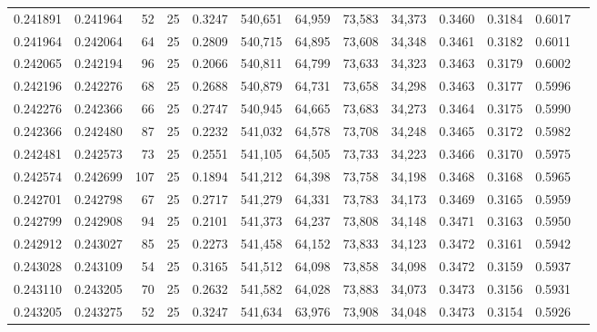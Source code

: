 \begin{tabular}{rrrrrrrrrrrrr}
0.241891 & 0.241964 &    52 &  25 &                                     0.3247 & 540,651 &  64,959 &  73,583 &  34,373 & 0.3460 & 0.3184 & 0.6017 \\
0.241964 & 0.242064 &    64 &  25 &                                     0.2809 & 540,715 &  64,895 &  73,608 &  34,348 & 0.3461 & 0.3182 & 0.6011 \\
0.242065 & 0.242194 &    96 &  25 &                                     0.2066 & 540,811 &  64,799 &  73,633 &  34,323 & 0.3463 & 0.3179 & 0.6002 \\
0.242196 & 0.242276 &    68 &  25 &                                     0.2688 & 540,879 &  64,731 &  73,658 &  34,298 & 0.3463 & 0.3177 & 0.5996 \\
0.242276 & 0.242366 &    66 &  25 &                                     0.2747 & 540,945 &  64,665 &  73,683 &  34,273 & 0.3464 & 0.3175 & 0.5990 \\
0.242366 & 0.242480 &    87 &  25 &                                     0.2232 & 541,032 &  64,578 &  73,708 &  34,248 & 0.3465 & 0.3172 & 0.5982 \\
0.242481 & 0.242573 &    73 &  25 &                                     0.2551 & 541,105 &  64,505 &  73,733 &  34,223 & 0.3466 & 0.3170 & 0.5975 \\
0.242574 & 0.242699 &   107 &  25 &                                     0.1894 & 541,212 &  64,398 &  73,758 &  34,198 & 0.3468 & 0.3168 & 0.5965 \\
0.242701 & 0.242798 &    67 &  25 &                                     0.2717 & 541,279 &  64,331 &  73,783 &  34,173 & 0.3469 & 0.3165 & 0.5959 \\
0.242799 & 0.242908 &    94 &  25 &                                     0.2101 & 541,373 &  64,237 &  73,808 &  34,148 & 0.3471 & 0.3163 & 0.5950 \\
0.242912 & 0.243027 &    85 &  25 &                                     0.2273 & 541,458 &  64,152 &  73,833 &  34,123 & 0.3472 & 0.3161 & 0.5942 \\
0.243028 & 0.243109 &    54 &  25 &                                     0.3165 & 541,512 &  64,098 &  73,858 &  34,098 & 0.3472 & 0.3159 & 0.5937 \\
0.243110 & 0.243205 &    70 &  25 &                                     0.2632 & 541,582 &  64,028 &  73,883 &  34,073 & 0.3473 & 0.3156 & 0.5931 \\
0.243205 & 0.243275 &    52 &  25 &                                     0.3247 & 541,634 &  63,976 &  73,908 &  34,048 & 0.3473 & 0.3154 & 0.5926 \\

\end{tabular}
